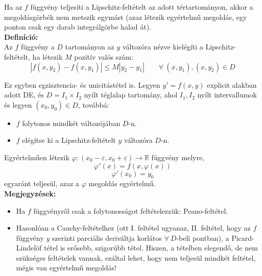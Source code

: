 \documentclass[11pt,a4paper]{article}
\begin{document}
    \begin{tcolorbox}[colback=red!5!white,colframe=red!60!black,title= 4. Lipschitz-feltétel]
        Ha az $f$ függvény teljesíti a Lipschitz-feltételt az adott tértartományon, akkor a megoldásgörbék nem metszik egymást (azaz létezik egyértelmű megoldás, egy ponton csak egy darab integrálgörbe halad át). \\
        \textbf{Definíció:} \\
        Az $f$ függvény a $D$ tartományon az $y$ változóra nézve kielégíti a Lipschitz-feltételt, ha létezik $M$ pozitív valós szám:
        $$\left|f(x,y_{2}) - f(x,y_{1})\right| \leq M\left|y_{2}-y_{1}\right| \quad\quad \forall\ (x,y_1),(x,y_2) \in D$$ 
    \end{tcolorbox}

    \begin{tcolorbox}[colback=red!5!white,colframe=red!60!black,title= 5. Picard-Lindelöf tétel]
        Ez egyben egzisztencia- és unicitástétel is. Legyen $y' = f(x,y)$ explicit alakban adott DE, és $D = I_1 \times I_2$ nyílt téglalap tartomány, ahol $I_1, I_2$ nyílt intervallumok és legyen $(x_0,y_0) \in D$, továbbá:
        \begin{itemize}
            \item $f$ folytonos mindkét változójában $D$-n.
            \item $f$ elégítse ki a Lipschitz-feltételt $y$ változóra $D$-n.
        \end{itemize}
        Egyértelműen létezik $\varphi: (x_0 - \varepsilon,x_0 + \varepsilon) \rightarrow \mathbb{R}$ függvény melyre,
        $$\varphi'(x) = f(x,\varphi(x))$$
        $$\varphi'(x_0) = y_0$$
        egyaránt teljesül, azaz a $\varphi$ megoldás egyértelmű. \\
        \textbf{Megjegyzések:}
        \begin{itemize}
            \item Ha $f$ függvényről csak a folytonosságot feltételezzük: Peano-feltétel.
            \item Hasonlóan a Cauchy-feltételhez (ott I. feltétel ugyanaz, II. feltétel, hogy az $f$ függvény $y$ szerinti parciális deriváltja korlátos $\forall\ D$-beli pontban), a Picard-Lindelöf tétel is erősebb, szigorúbb tétel. Hiszen, a tételben elegendő, de nem szükséges feltételek vannak, ezáltal lehet, hogy nem teljesül mindkét feltétel, mégis van egyértelmű megoldás!
        \end{itemize}
    \end{tcolorbox}
\end{document}
